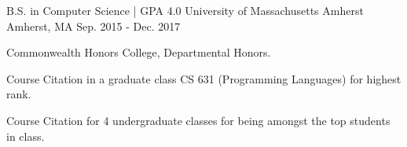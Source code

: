 

\begin{cventries}

  \cventry
    {B.S. in Computer Science | GPA 4.0} %
    {University of Massachusetts Amherst} %
    {Amherst, MA} %
    {Sep. 2015 - Dec. 2017} %
    {
      \begin{cvitems} %
        \item Commonwealth Honors College, Departmental Honors.
        \item Course Citation in a graduate class CS 631 (Programming Languages) for highest rank.
        \item Course Citation for 4 undergraduate classes for being amongst the top students in class.
      \end{cvitems}
    }

\end{cventries}
